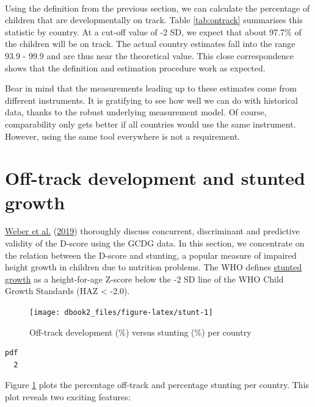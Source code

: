 \documentclass[
]{book}
\begin{document}
~

Using the definition from the previous section, we can calculate the percentage of children that are developmentally on track. Table \ref{tab:ontrack} summarises this statistic by country. At a cut-off value of -2 SD, we expect that about 97.7\% of the children will be on track. The actual country estimates fall into the range 93.9 - 99.9 and are thus near the theoretical value. This close correspondence shows that the definition and estimation procedure work as expected.

Bear in mind that the measurements leading up to these estimates come from different instruments. It is gratifying to see how well we can do with historical data, thanks to the robust underlying measurement model. Of course, comparability only gets better if all countries would use the same instrument. However, using the same tool everywhere is not a requirement.

\hypertarget{sec:otherestimates}{%
\section{Off-track development and stunted growth}\label{sec:otherestimates}}

\protect\hyperlink{ref-Weber2019}{Weber et al.} (\protect\hyperlink{ref-Weber2019}{2019}) thoroughly discuss concurrent, discriminant and predictive validity of the D-score using the GCDG data. In this section, we concentrate on the relation between the D-score and stunting, a popular measure of impaired height growth in children due to nutrition problems. The WHO defines \href{https://www.who.int/nutrition/healthygrowthproj/en/index1.html}{stunted growth} as a height-for-age Z-score below the -2 SD line of the WHO Child Growth Standards (HAZ \textless{} -2.0).

\begin{figure}

{\centering \texttt{[image: dbook2\_files/figure-latex/stunt-1]} 

}

\caption{Off-track development (\%) versus stunting (\%) per country}\label{fig:stunt}
\end{figure}

\begin{verbatim}
pdf 
  2 
\end{verbatim}



Figure \ref{fig:stunt} plots the percentage off-track and percentage stunting per country. This plot reveals two exciting features:
\end{document}
